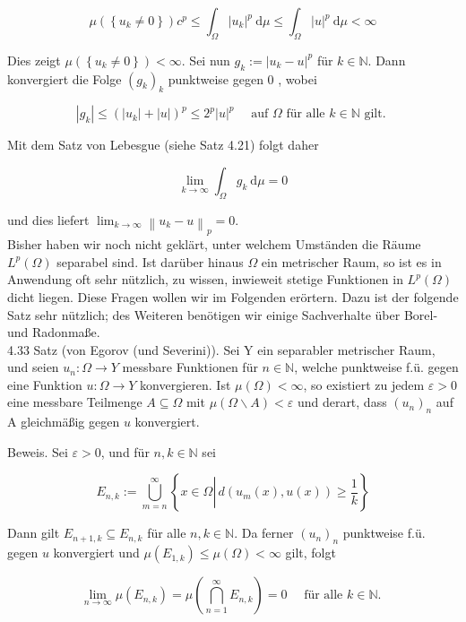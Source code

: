 \documentclass[10pt, letterpaper]{article}
\begin{document}
$$
\mu\left(\left\{u_{k} \neq 0\right\}\right) c^{p} \leq \int_{\Omega}\left|u_{k}\right|^{p} \mathrm{~d} \mu \leq \int_{\Omega}|u|^{p} \mathrm{~d} \mu<\infty
$$

Dies zeigt $\mu\left(\left\{u_{k} \neq 0\right\}\right)<\infty$. Sei nun $g_{k}:=\left|u_{k}-u\right|^{p}$ für $k \in \mathbb{N}$. Dann konvergiert die Folge $\left(g_{k}\right)_{k}$ punktweise gegen 0 , wobei

$$
\left|g_{k}\right| \leq\left(\left|u_{k}\right|+|u|\right)^{p} \leq 2^{p}|u|^{p} \quad \text { auf } \Omega \text { für alle } k \in \mathbb{N} \text { gilt. }
$$

Mit dem Satz von Lebesgue (siehe Satz 4.21) folgt daher

$$
\lim _{k \rightarrow \infty} \int_{\Omega} g_{k} \mathrm{~d} \mu=0
$$

und dies liefert $\lim _{k \rightarrow \infty}\left\|u_{k}-u\right\|_{p}=0$.\\
Bisher haben wir noch nicht geklärt, unter welchem Umständen die Räume $L^{p}(\Omega)$ separabel sind. Ist darüber hinaus $\Omega$ ein metrischer Raum, so ist es in Anwendung oft sehr nützlich, zu wissen, inwieweit stetige Funktionen in $L^{p}(\Omega)$ dicht liegen. Diese Fragen wollen wir im Folgenden erörtern. Dazu ist der folgende Satz sehr nützlich; des Weiteren benötigen wir einige Sachverhalte über Borel- und Radonmaße.\\
4.33 Satz (von Egorov (und Severini)). Sei Y ein separabler metrischer Raum, und seien $u_{n}: \Omega \rightarrow Y$ messbare Funktionen für $n \in \mathbb{N}$, welche punktweise f.ü. gegen eine Funktion $u: \Omega \rightarrow Y$ konvergieren. Ist $\mu(\Omega)<\infty$, so existiert zu jedem $\varepsilon>0$ eine messbare Teilmenge $A \subseteq \Omega$ mit $\mu(\Omega \backslash A)<\varepsilon$ und derart, dass $\left(u_{n}\right)_{n}$ auf A gleichmäßig gegen $u$ konvergiert.

Beweis. Sei $\varepsilon>0$, und für $n, k \in \mathbb{N}$ sei

$$
E_{n, k}:=\bigcup_{m=n}^{\infty}\left\{x \in \Omega \left\lvert\, d\left(u_{m}(x), u(x)\right) \geq \frac{1}{k}\right.\right\}
$$

Dann gilt $E_{n+1, k} \subseteq E_{n, k}$ für alle $n, k \in \mathbb{N}$. Da ferner $\left(u_{n}\right)_{n}$ punktweise f.ü. gegen $u$ konvergiert und $\mu\left(E_{1, k}\right) \leq \mu(\Omega)<\infty$ gilt, folgt

$$
\lim _{n \rightarrow \infty} \mu\left(E_{n, k}\right)=\mu\left(\bigcap_{n=1}^{\infty} E_{n, k}\right)=0 \quad \text { für alle } k \in \mathbb{N} \text {. }
$$
\end{document}
